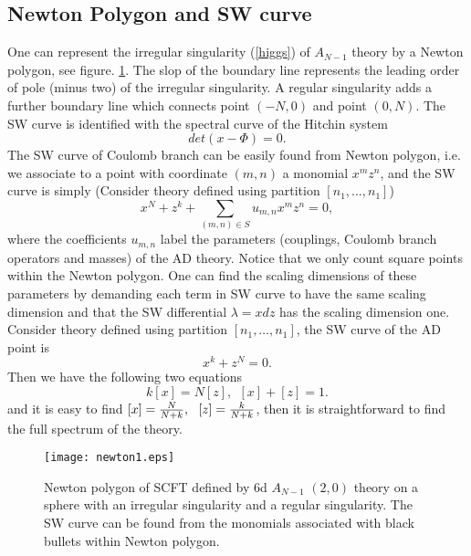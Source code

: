 \documentclass[a4paper,11pt]{article}
\begin{document}
\subsection{Newton Polygon and SW curve}
One can represent the irregular singularity (\ref{higgs}) of $A_{N-1}$ theory by a Newton polygon, see figure. \ref{torus}. The slop of the boundary line 
represents the leading order of pole (minus two) of the irregular singularity. 
A regular singularity adds a further boundary line which connects point $(-N,0)$ and point $(0,N)$.  
The SW curve is identified with the spectral curve of the Hitchin system 
\begin{equation}
det(x-\Phi)=0.
\end{equation}
The SW curve of Coulomb branch can be easily found from Newton polygon, i.e. we associate to a point with coordinate $(m,n)$ a monomial $x^m z^n$, and the SW curve  is simply (Consider theory defined using partition $[n_1,\ldots, n_1]$)
\begin{equation}
x^N+z^k+\sum_{(m,n)\in S} u_{m,n} x^m z^n=0,
\end{equation}
where the coefficients $u_{m,n}$ label the parameters (couplings, Coulomb branch operators and masses) of the AD theory. Notice that we only count square points within the Newton polygon. 
One can find the scaling dimensions of these parameters by demanding each term in SW curve to have the same scaling dimension and  that the SW differential $\lambda=x dz$ has the scaling dimension one. 
Consider theory defined using partition $[n_1,\ldots, n_1]$, the SW curve of the AD point is 
\begin{equation}
x^k+z^N=0.
\end{equation}
Then we have the following two equations
\begin{equation}
k[x]=N[z],~~[x]+[z]=1.
\end{equation}
and it is easy to find  $[x]={N\over N+k},~~[z]={k\over N+k}$, then it is straightforward to find the full spectrum of the theory. 



\begin{center}
\begin{figure}[htbp]
\small
\centering
\texttt{[image: newton1.eps]}
\caption{Newton polygon of SCFT defined by 6d $A_{N-1}$ $(2,0)$ theory on a sphere with an irregular singularity and a regular singularity. The SW curve can be found from the monomials associated with black bullets within Newton polygon.}
\label{torus}
\end{figure}
\end{center}
\end{document}
